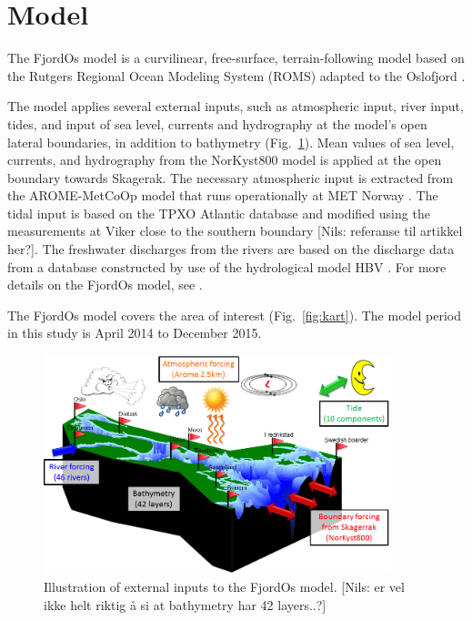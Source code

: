 \section{Model}

The FjordOs model is a curvilinear, free-surface, terrain-following model based on the Rutgers Regional Ocean Modeling System (ROMS) \citep{haidv:etal:2008,shche:mcwil:2003,shche:mcwil:2005,shche:mcwil:2009} adapted to the Oslofjord \citep{roed:etal:2016}. 

The model applies several external inputs, such as atmospheric input, river input, tides, and input of sea level, currents and hydrography at the model's open lateral boundaries, in addition to bathymetry (Fig.~\ref{fig:oppbygging}). Mean values of sea level, currents, and hydrography from the NorKyst800 model \citep{albre:etal:2011} is applied at the open boundary towards Skagerak. The necessary atmospheric input is extracted from the AROME-MetCoOp model that runs operationally at MET Norway \citep{mulle:etal:2015}. The tidal input is based on the TPXO Atlantic database \citep{egber:erofe:2002} and modified using the measurements at Viker close to the southern boundary [Nils: referanse til artikkel her?]. The freshwater discharges from the rivers are based on the discharge data from a database constructed by use of the hydrological model HBV \citep{beldr:etal:2003}. For more details on the FjordOs model, see \cite{roed:etal:2016}.

The FjordOs model covers the area of interest (Fig.~\ref{fig:kart}). The model period in this study is April 2014 to December 2015.

\begin{figure}[htb]
\centerline{
\includegraphics*[width=0.9\textwidth]{Figurer/oppbygging}
}
\caption{\small
Illustration of external inputs to the FjordOs model. [Nils: er vel ikke helt riktig å si at bathymetry har 42 layers..?]
}
\label{fig:oppbygging}
\end{figure}

\newpage
